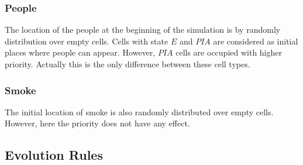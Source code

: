 \subsubsection{People}
The location of the people at the beginning of the simulation is by randomly
distribution over empty cells. Cells with state $E$ and $PIA$ are considered as
initial places where people can appear. However, $PIA$ cells are occupied with
higher priority. Actually this is the only difference between these cell types.
\subsubsection{Smoke}
The initial location of smoke is also randomly distributed over empty cells.
However, here the priority does not have any effect.


\subsection{Evolution Rules}
